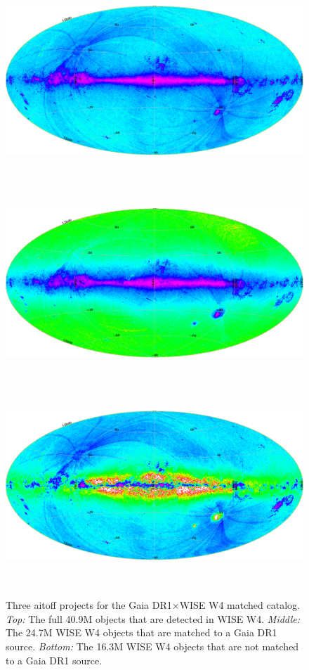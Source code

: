 \documentclass[usenatbib]{mn2e}
\begin{document}
\newpage
\centering
\begin{figure}
\begin{center}
    \includegraphics[height=7.5cm,width=14.0cm]{../../Gaia/plots/all_rainbow3.png}
    \includegraphics[height=7.5cm,width=14.0cm]{../../Gaia/plots/matches_rainbow3.png}
    \includegraphics[height=7.5cm,width=14.0cm]{../../Gaia/plots/nonmatches_rainbow3.png}
    \caption[Lorem ipsum dolor sit amet, consectetur adipiscing elit. Aliquam porta sodales est, vel cursus risus porta non.]
    {Three aitoff projects for the Gaia DR1$\times$WISE W4 matched catalog.
    {\it Top:} The full 40.9M objects that are detected in WISE W4. 
    {\it Middle:}  The 24.7M WISE W4 objects that are matched to a Gaia DR1 source. 
    {\it Bottom:}  The 16.3M WISE W4 objects that are not matched to a Gaia DR1 source. 
  }
    \label{fig:fig5}
\end{center}
\end{figure}








\end{document}
